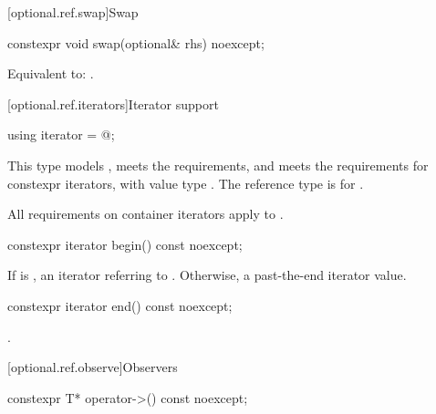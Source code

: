 [optional.ref.swap]{Swap}

\begin{itemdecl}
constexpr void swap(optional& rhs) noexcept;
\end{itemdecl}

\begin{itemdescr}
\pnum
\effects
Equivalent to: .
\end{itemdescr}

[optional.ref.iterators]{Iterator support}

\begin{itemdecl}
using iterator = @\impdef@;
\end{itemdecl}

\begin{itemdescr}
\pnum
This type
models ,
meets the  requirements,
and meets the requirements for constexpr iterators,
with value type .
The reference type is  for .

\pnum
All requirements on container iterators apply to
.
\end{itemdescr}

\begin{itemdecl}
constexpr iterator begin() const noexcept;
\end{itemdecl}

\begin{itemdescr}
\pnum
\returns
  If  is ,
  an iterator referring to .
  Otherwise, a past-the-end iterator value.
\end{itemdescr}

\begin{itemdecl}
constexpr iterator end() const noexcept;
\end{itemdecl}

\begin{itemdescr}
\pnum
\returns
{}.
\end{itemdescr}

[optional.ref.observe]{Observers}

\begin{itemdecl}
constexpr T* operator->() const noexcept;
\end{itemdecl}

